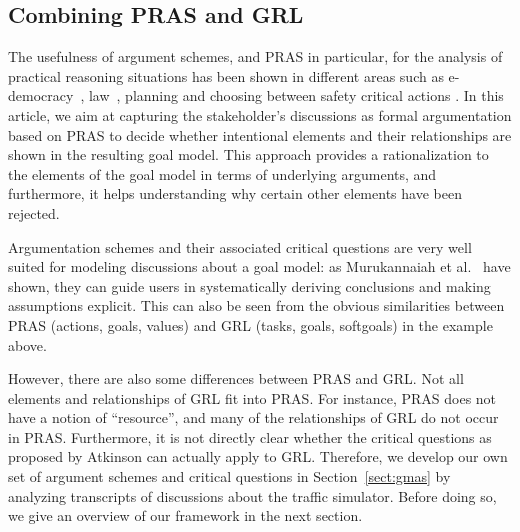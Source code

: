 \subsection{Combining PRAS and GRL}
\label{sect:background:pras:motivation}

The usefulness of argument schemes, and PRAS in particular, for the analysis of practical reasoning situations has been shown in different areas such as e-democracy~\cite{cartwright2009IS}, law~\cite{atkinson2005legal}, planning \cite{medellin2013planning} and choosing between safety critical actions \cite{tolchinsky2012deliberation}. In this article, we aim at capturing the stakeholder's discussions as formal argumentation based on PRAS to decide whether intentional elements and their relationships are shown in the resulting goal model. This approach provides a rationalization to the elements of the goal model in terms of underlying arguments, and furthermore, it helps understanding why certain other elements have been rejected.

Argumentation schemes and their associated critical questions are very well suited for modeling discussions about a goal model: as Murukannaiah et al.~\cite{murukannaiah2015} have shown, they can guide users in systematically deriving conclusions and making assumptions explicit. This can also be seen from the obvious similarities between PRAS (actions, goals, values) and GRL (tasks, goals, softgoals) in the example above.

However, there are also some differences between PRAS and GRL. Not all elements and relationships of GRL fit into PRAS. For instance, PRAS does not have a notion of ``resource'', and many of the relationships of GRL do not occur in PRAS. Furthermore, it is not directly clear whether the critical questions as proposed by Atkinson can actually apply to GRL. Therefore, we develop our own set of argument schemes and critical questions in Section~\ref{sect:gmas} by analyzing transcripts of discussions about the traffic simulator. Before doing so, we give an overview of our framework in the next section.